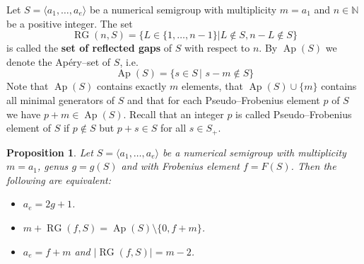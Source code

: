 \documentclass[a4paper,12pt,scrbook]{amsart}
\def \N{\mathbb N}
\theoremstyle{plain}%
\newtheorem{proposition}[satz]{Proposition}
\theoremstyle{definition}
\begin{document}
Let $S = \langle a_1, \ldots, a_e\rangle$ be a numerical semigroup with 
multiplicity $m = a_1$ and $n \in \N$ be a 
positive integer. The set 
	$$\operatorname{RG}(n, S)=\{L \in \{1,\ldots, n-1\} \vert L \notin S, n-L \notin S\}$$ 
is called the \textbf{set of reflected gaps} of $S$ with respect to $n$. By 
$\operatorname{Ap}(S)$ we denote the Ap\'ery--set of $S$, i.e. 
	$$ \operatorname{Ap}(S) = \{ s \in S \, \vert \,\, s - m \notin S \} $$
Note that $\operatorname{Ap}(S)$ contains exactly $m$ elements, that 
$\operatorname{Ap}(S) \cup \{m\}$ contains all minimal generators of $S$ 
and that for each Pseudo--Frobenius element $p$ of $S$ we have $p + m 
\in \operatorname{Ap}(S)$. Recall that an integer $p$ is called Pseudo--Frobenius 
element of $S$ if $p \notin S$ but $p+s \in S$ for all $s \in S_+$. 

\begin{proposition}\label{prop:gplusm_refelcted}
Let $S = \langle a_1, \ldots, a_e\rangle$ be a numerical semigroup with multiplicity 
$m=a_1$, genus $g = g(S)$ and with Frobenius element $f = F(S)$. Then the 
following are equivalent: 
\begin{itemize}
\item[i)] $a_e = 2 g+1$. 
\item[ii)] $m+\operatorname{RG}(f, S) = \operatorname{Ap}(S) 
\setminus \{0, f+m\}$. 
\item[iii)] $a_e = f+m$ and $\vert \operatorname{RG}(f, S) \vert = m-2$.
\end{itemize}
\end{proposition}
\end{document}
